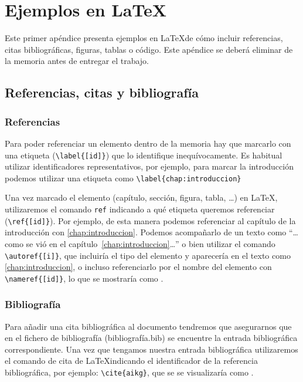 \chapter{Ejemplos en \LaTeX}

Este primer apéndice presenta ejemplos en \LaTeX de cómo incluir referencias, citas bibliográficas, figuras, tablas o código. Este apéndice se deberá eliminar de la memoria antes de entregar el trabajo. 

\section{Referencias, citas y bibliografía}
\subsection{Referencias}
Para poder referenciar un elemento dentro de la memoria hay que marcarlo con una etiqueta (\verb|\label{[id]}|) que lo identifique inequívocamente. Es habitual utilizar identificadores  representativos, por ejemplo, para marcar la introducción podemos utilizar una etiqueta como \verb|\label{chap:introduccion}|

Una vez marcado el elemento (capítulo, sección, figura, tabla, \ldots) en \LaTeX, utilizaremos el comando \verb|ref| indicando a qué etiqueta queremos referenciar (\verb|\ref{[id]}|). Por ejemplo, de esta manera podemos referenciar al capítulo de la introducción con \ref{chap:introduccion}. Podemos acompañarlo de un texto como ``\ldots como se vió en el capítulo~\ref{chap:introduccion}\ldots'' o bien utilizar el comando \verb|\autoref{[i]}|, que incluiría el tipo del elemento y aparecería en el texto como \autoref{chap:introduccion}, o incluso referenciarlo por el nombre del elemento con \verb|\nameref{[id]}|, lo que se mostraría como . 

\subsection{Bibliografía}
Para añadir una cita bibliográfica al documento tendremos que asegurarnos que en el fichero de bibliografía (bibliografía.bib) se encuentre la entrada bibliográfica correspondiente. Una vez que tengamos nuestra entrada bibliográfica utilizaremos el comando de cita de \LaTeX indicando el identificador de la referencia bibliográfica, por ejemplo: 
\verb|\cite{aikg}|, que se se visualizaría como \cite{aikg}.

